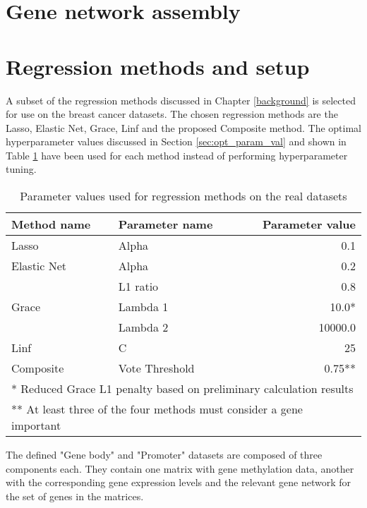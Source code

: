 \section{Gene network assembly} \label{sec_netwk}

\pagebreak
\section{Regression methods and setup}
A subset of the regression methods discussed in Chapter \ref{background} is selected for use on the breast cancer datasets. The chosen regression methods are the Lasso, Elastic Net, Grace, Linf and the proposed Composite method.
The optimal hyperparameter values discussed in Section \ref{sec:opt_param_val} and shown in Table \ref{tab:opt_param_val} have been used for each method instead of performing hyperparameter tuning.

{\def\arraystretch{1.5}\tabcolsep=10pt
	\begin{table}[H]
		\label{tab:opt_param_val}
		\caption{Parameter values used for regression methods on the real datasets}
		\centering
		\begin{tabular}{l l r}
			\hline\hline 
			Method name & Parameter name & Parameter value\\
			\hline\hline
			Lasso	&	Alpha	&	0.1\\
			\hline
			Elastic Net	&	Alpha	&	0.2\\
						&	L1 ratio&	0.8\\
			\hline
			Grace	&	Lambda 1	&	10.0*\\
					&	Lambda 2	&	10000.0\\
			\hline
			Linf	&	C	&	25\\
			\hline
			Composite	&	Vote Threshold	&	0.75**\\
			\hline
			\multicolumn{3}{l}{* Reduced Grace L1 penalty based on preliminary calculation results}\\
			\multicolumn{3}{l}{** At least three of the four methods must consider a gene important}\\
		\end{tabular}
	\end{table}
}

The defined "Gene body" and "Promoter" datasets are composed of three components each. They contain one matrix with gene methylation data, another with the corresponding gene expression levels and the relevant gene network for the set of genes in the matrices.

